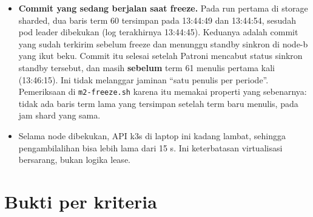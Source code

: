 \begin{itemize}
\item \textbf{Commit yang sedang berjalan saat freeze.} Pada run pertama di storage sharded, dua baris term 60 tersimpan pada 13:44:49 dan 13:44:54, sesudah pod leader dibekukan (log terakhirnya 13:44:45). Keduanya adalah commit yang sudah terkirim sebelum freeze dan menunggu standby sinkron di node-b yang ikut beku. Commit itu selesai setelah Patroni mencabut status sinkron standby tersebut, dan masih \textbf{sebelum} term 61 menulis pertama kali (13:46:15). Ini tidak melanggar jaminan ``satu penulis per periode''. Pemeriksaan di \texttt{m2-\allowbreak{}freeze.\allowbreak{}sh} karena itu memakai properti yang sebenarnya: tidak ada baris term lama yang tersimpan setelah term baru menulis, pada jam shard yang sama.
\item Selama node dibekukan, API k3s di laptop ini kadang lambat, sehingga pengambilalihan bisa lebih lama dari 15 s. Ini keterbatasan virtualisasi bersarang, bukan logika lease.
\end{itemize}

\section{Bukti per kriteria}

